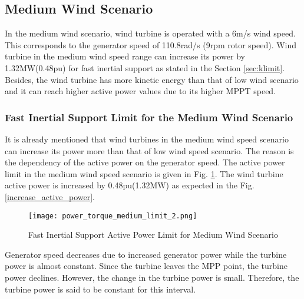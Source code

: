 \subsection{Medium Wind Scenario}
In the medium wind scenario, wind turbine is operated with a 6m/s wind speed. This corresponds to the generator speed of 110.8rad/s (9rpm rotor speed). Wind turbine in the medium wind speed range can increase its power by 1.32MW(0.48pu) for fast inertial support as stated in the Section \ref{sec:klimit}. Besides, the wind turbine has more kinetic energy than that of low wind scenario and it can reach higher active power values due to its higher MPPT speed. 
\subsubsection{Fast Inertial Support Limit for the Medium Wind Scenario}
It is already mentioned that wind turbines in the medium wind speed scenario can increase its power more than that of low wind speed scenario. The reason is the dependency of the active power on the generator speed. The active power limit in the medium wind speed scenario is given in Fig. \ref{medium_limit_power}. The wind turbine active power is increased by 0.48pu(1.32MW) as expected in the Fig. \ref{increase_active_power}.\par
\begin{figure}[h]
	\centering
	\texttt{[image: power\_torque\_medium\_limit\_2.png]}
	\caption{Fast Inertial Support Active Power Limit for Medium Wind Scenario}
	\label{medium_limit_power}
\end{figure}
 Generator speed decreases due to increased generator power while the turbine power is almost constant. Since the turbine leaves the MPP point, the turbine power declines. However, the change in the turbine power is small. Therefore, the turbine power is said to be constant for this interval. 
